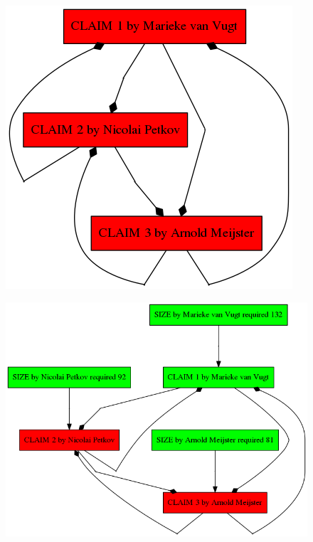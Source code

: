 \documentclass{beamer}
\begin{document}
\begin{frame}[plain]
	\begin{figure}
		\includegraphics[keepaspectratio,width=\textwidth,height=\textheight,]{demo/claims}
	\end{figure}
\end{frame}

\begin{frame}[plain]
	\begin{figure}
		\includegraphics[keepaspectratio,width=\textwidth,height=\textheight,]{demo/0}
	\end{figure}
\end{frame}
\end{document}
